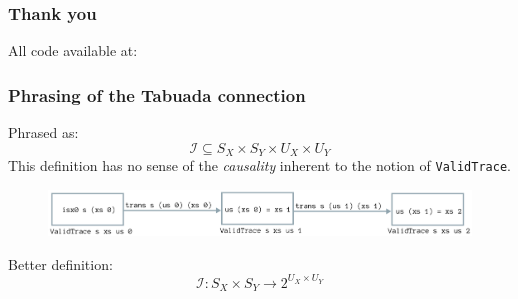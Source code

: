 \documentclass{beamer}
\begin{document}
\begin{frame}[fragile]
\frametitle{Thank you}
    All code available at:

    {\tiny
    }

\end{frame}

\begin{frame}[fragile]
\frametitle{Phrasing of the Tabuada connection}

Phrased as: $$\mathcal{I} \subseteq S_X \times S_Y \times U_X \times U_Y$$
\pause
This definition has no sense of the \emph{causality} inherent to the notion
of \texttt{ValidTrace}.
\pause
\begin{figure}[H]
\includegraphics[width=\textwidth]{validtrace.png}
\end{figure}
\pause
Better definition:
$$\mathcal{I}: S_X \times S_Y \rightarrow  2^{U_X \times U_Y}$$

\end{frame}
\end{document}
